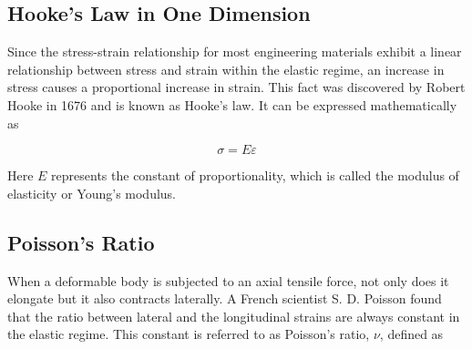 \documentclass[
10pt,
a4paper,
openany,
svgnames,
]{book}
\begin{document}
\subsection{Hooke’s Law in One Dimension}

Since the stress-strain relationship for most engineering materials exhibit a linear relationship between stress and strain within the elastic regime, an increase in stress causes a proportional increase in strain. This fact was discovered by Robert Hooke in 1676 and is known as Hooke’s law. It can be expressed mathematically as

\begin{equation}
  \sigma  = E\varepsilon
\end{equation}

Here $E$ represents the constant of proportionality, which is called the modulus of elasticity or Young’s modulus.

\subsection{Poisson’s Ratio}

When a deformable body is subjected to an axial tensile force, not only does it elongate but it also contracts laterally. A French scientist S. D. Poisson found that the ratio between lateral and the longitudinal strains are always constant in the elastic regime. This constant is referred to as Poisson’s ratio, $\nu$, defined as

\begin{figure}[h]
  \centering
\end{figure}
\end{document}
